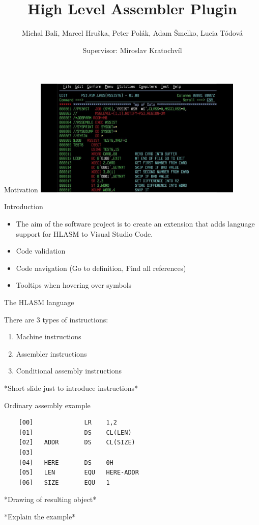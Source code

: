 \documentclass[10pt]{beamer}
\title{High Level Assembler Plugin}
\subtitle{}
\date{Supervisor: Miroslav Kratochvíl}
\author{Michal Bali, Marcel Hruška, Peter Polák, Adam Šmelko, Lucia Tódová}
\begin{document}
\maketitle


\begin{frame}[fragile]{Motivation}
\centering
\includegraphics[width=10cm]{img/maxresdefault}

\end{frame}

\begin{frame}[fragile]{Introduction}

    \begin{itemize}
    	\item The aim of the software project is to create an extension that adds language support for HLASM to Visual Studio Code.
    	\item Code validation
    	\item Code navigation (Go to definition, Find all references)
    	\item Tooltips when hovering over symbols
    \end{itemize}
\end{frame}



\begin{frame}[fragile]{The HLASM language}

There are 3 types of instructions:
\begin{enumerate}
	\item Machine instructions
	\item Assembler instructions
	\item Conditional assembly instructions
\end{enumerate}


*Short slide just to introduce instructions*

\end{frame}


\begin{frame}[fragile]{Ordinary assembly example}
  
	\begin{verbatim}
	[00]              LR    1,2
	[01]              DS    CL(LEN)
	[02]   ADDR       DS    CL(SIZE)
	[03]
	[04]   HERE       DS    0H
	[05]   LEN        EQU   HERE-ADDR
	[06]   SIZE       EQU   1
	\end{verbatim}
	
	*Drawing of resulting object*
	
	*Explain the example* 
\end{frame}
\end{document}
